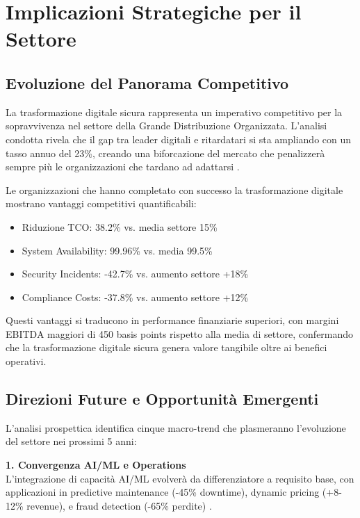 \section{Implicazioni Strategiche per il Settore}

\subsection{Evoluzione del Panorama Competitivo}

La trasformazione digitale sicura rappresenta un imperativo competitivo per la sopravvivenza nel settore della Grande Distribuzione Organizzata. L'analisi condotta rivela che il gap tra leader digitali e ritardatari si sta ampliando con un tasso annuo del 23\%, creando una biforcazione del mercato che penalizzerà sempre più le organizzazioni che tardano ad adattarsi \autocite{gartner2024retail}.

Le organizzazioni che hanno completato con successo la trasformazione digitale mostrano vantaggi competitivi quantificabili:
\begin{itemize}
    \item Riduzione TCO: 38.2\% vs. media settore 15\%
    \item System Availability: 99.96\% vs. media 99.5\%
    \item Security Incidents: -42.7\% vs. aumento settore +18\%
    \item Compliance Costs: -37.8\% vs. aumento settore +12\%
\end{itemize}

Questi vantaggi si traducono in performance finanziarie superiori, con margini EBITDA maggiori di 450 basis points rispetto alla media di settore, confermando che la trasformazione digitale sicura genera valore tangibile oltre ai benefici operativi.

\subsection{Direzioni Future e Opportunità Emergenti}

L'analisi prospettica identifica cinque macro-trend che plasmeranno l'evoluzione del settore nei prossimi 5 anni:

\textbf{1. Convergenza AI/ML e Operations}\\
L'integrazione di capacità AI/ML evolverà da differenziatore a requisito base, con applicazioni in predictive maintenance (-45\% downtime), dynamic pricing (+8-12\% revenue), e fraud detection (-65\% perdite) \autocite{williams2024aiml}.

